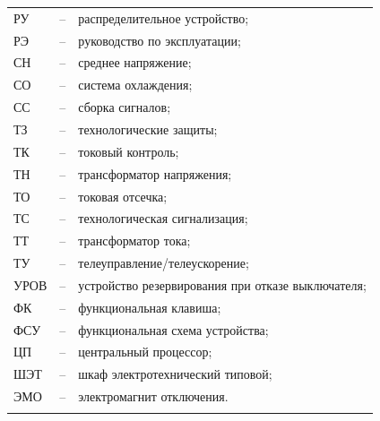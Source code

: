\begin{longtable}{>{\raggedright\arraybackslash}m{2cm}>{\raggedright\arraybackslash}m{0.5cm}>{\raggedright\arraybackslash}m{20cm}}
РУ & -- & распределительное устройство; \\
РЭ & -- & руководство по эксплуатации; \\
СН & -- & среднее напряжение; \\
СО & -- & система охлаждения; \\
СС & -- & сборка сигналов; \\
ТЗ & -- & технологические защиты; \\
ТК & -- & токовый контроль; \\
ТН & -- & трансформатор напряжения; \\
ТО & -- & токовая отсечка; \\
ТС & -- & технологическая сигнализация; \\
ТТ & -- & трансформатор тока; \\
ТУ & -- & телеуправление/телеускорение; \\
УРОВ & -- & устройство резервирования при отказе выключателя; \\
ФК & -- & функциональная клавиша; \\
ФСУ & -- & функциональная схема устройства; \\
ЦП & -- & центральный процессор; \\
ШЭТ & -- & шкаф электротехнический типовой; \\
ЭМО & -- & электромагнит отключения. \\
{\color{white}\fontsize{0.1pt}{0.1pt}\selectfont<endABBRS>}
\end{longtable}
